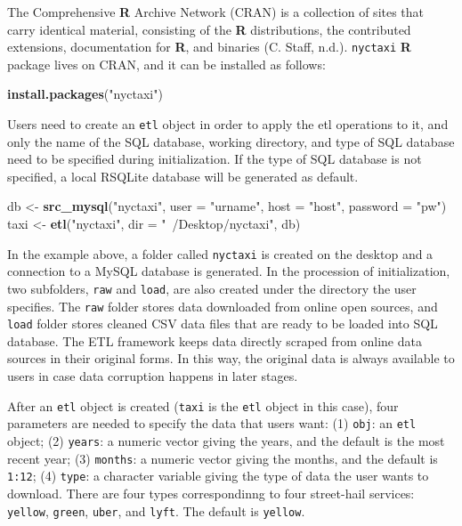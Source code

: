 \documentclass[12pt,twoside]{reedthesis}
\newenvironment{Shaded}{\begin{snugshade}}{\end{snugshade}}
\newcommand{\KeywordTok}[1]{\textcolor[rgb]{0.13,0.29,0.53}{\textbf{#1}}}
\newcommand{\DataTypeTok}[1]{\textcolor[rgb]{0.13,0.29,0.53}{#1}}
\newcommand{\StringTok}[1]{\textcolor[rgb]{0.31,0.60,0.02}{#1}}
\newcommand{\NormalTok}[1]{#1}
\theoremstyle{definition}
\theoremstyle{definition}
\theoremstyle{definition}
\theoremstyle{remark}
\begin{document}
The Comprehensive \textbf{R} Archive Network (CRAN) is a collection of
sites that carry identical material, consisting of the \textbf{R}
distributions, the contributed extensions, documentation for \textbf{R},
and binaries (C. Staff, n.d.). \texttt{nyctaxi} \textbf{R} package lives
on CRAN, and it can be installed as follows:
\begin{Shaded}
\begin{Highlighting}[]
\KeywordTok{install.packages}\NormalTok{(}\StringTok{"nyctaxi"}\NormalTok{)}
\end{Highlighting}
\end{Shaded}
Users need to create an \texttt{etl} object in order to apply the etl
operations to it, and only the name of the SQL database, working
directory, and type of SQL database need to be specified during
initialization. If the type of SQL database is not specified, a local
RSQLite database will be generated as default.
\begin{Shaded}
\begin{Highlighting}[]
\NormalTok{db <-}\StringTok{ }\KeywordTok{src_mysql}\NormalTok{(}\StringTok{"nyctaxi"}\NormalTok{, }\DataTypeTok{user =} \StringTok{"urname"}\NormalTok{, }\DataTypeTok{host =} \StringTok{"host"}\NormalTok{, }
                \DataTypeTok{password =} \StringTok{"pw"}\NormalTok{)}
\NormalTok{taxi <-}\StringTok{ }\KeywordTok{etl}\NormalTok{(}\StringTok{"nyctaxi"}\NormalTok{, }\DataTypeTok{dir =} \StringTok{"~/Desktop/nyctaxi"}\NormalTok{, db)}
\end{Highlighting}
\end{Shaded}
In the example above, a folder called \texttt{nyctaxi} is created on the
desktop and a connection to a MySQL database is generated. In the
procession of initialization, two subfolders, \texttt{raw} and
\texttt{load}, are also created under the directory the user specifies.
The \texttt{raw} folder stores data downloaded from online open sources,
and \texttt{load} folder stores cleaned CSV data files that are ready to
be loaded into SQL database. The ETL framework keeps data directly
scraped from online data sources in their original forms. In this way,
the original data is always available to users in case data corruption
happens in later stages.

After an \texttt{etl} object is created (\texttt{taxi} is the
\texttt{etl} object in this case), four parameters are needed to specify
the data that users want: (1) \texttt{obj}: an \texttt{etl} object; (2)
\texttt{years}: a numeric vector giving the years, and the default is
the most recent year; (3) \texttt{months}: a numeric vector giving the
months, and the default is \texttt{1:12}; (4) \texttt{type}: a character
variable giving the type of data the user wants to download. There are
four types correspondinng to four street-hail services: \texttt{yellow},
\texttt{green}, \texttt{uber}, and \texttt{lyft}. The default is
\texttt{yellow}.
\end{document}
